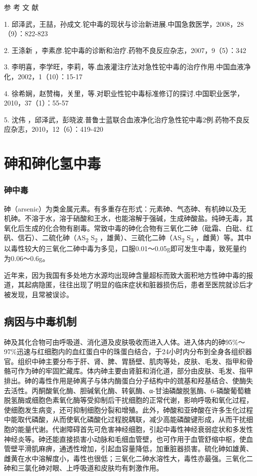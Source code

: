 \hypertarget{text00159.htmlux5cux23CHP5-6-3-4}{}
参 考 文 献

1.
邱泽武，王喆，孙成文.铊中毒的现状与诊治新进展.中国急救医学，2008，28（9）：822-823

2. 王涤新
，李素彦.铊中毒的诊断和治疗.药物不良反应杂志，2007，9（5）：342

3.
李明喜，李学旺，李莉，等.血液灌注疗法对急性铊中毒的治疗作用.中国血液净化，2002，1（10）：15-17

4.
徐希娴，赵赞梅，关里，等.对职业性铊中毒标准修订的探讨.中国职业医学，2010，37（1）：55-57

5. 沈伟
，邱泽武，彭晓波.普鲁士蓝联合血液净化治疗急性铊中毒2例.药物不良反应杂志，2010，12（6）：419-420

\protect\hypertarget{text00160.html}{}{}

\section{砷和砷化氢中毒}

\subsubsection{砷中毒}

砷（arsenic）为类金属元素。有多重存在形式：元素砷、气态砷、有机砷以及无机砷。不溶于水，溶于硝酸和王水，也能溶解于强碱，生成砷酸盐。纯砷无毒，其氧化后生成的化合物有剧毒。常致中毒的砷化合物有三氧化二砷（砒霜、白砒、红矾、信石）、二硫化砷（AS\textsubscript{2}
S\textsubscript{2} ，雄黄）、三硫化二砷（AS\textsubscript{2}
S\textsubscript{3}
，雌黄）等。其中以毒性较大的三氧化二砷中毒为多见，口服0.01～0.05g即可发生中毒，致死量约为0.06～0.6g。

近年来，因为我国有多处地方水源均出现砷含量超标而致大面积地方性砷中毒的报道，其起病隐匿，往往出现了明显的临床症状和脏器损伤后，患者至医院就诊后才被发现，且常被误诊。

\subsection{病因与中毒机制}

砷及其化合物可由呼吸道、消化道及皮肤吸收而进入人体。进入体内的砷95\%～97\%迅速与红细胞内的血红蛋白中的珠蛋白结合，于24小时内分布到全身各组织器官。组织中砷主要分布于肝、肾、脾、胃肠壁、肌肉等处，皮肤、毛发、指甲和骨骼可作为砷的牢固贮藏库。体内砷主要由肾脏和消化道，部分由皮肤、毛发、指甲排出。砷的毒性作用是砷离子与体内酶蛋白分子结构中的巯基和羟基结合、使酶失去活性。丙酮酸氧化酶、胆碱氧化酶、转氨酶、α-甘油磷酸脱氢酶、6-磷酸葡萄糖脱氢酶或细胞色素氧化酶等受抑制后干扰细胞的正常代谢，影响呼吸和氧化过程，使细胞发生病变，还可抑制细胞分裂和增殖。此外，砷酸和亚砷酸在许多生化过程中能取代磷酸，从而使氧化磷酸化过程脱耦联，减少高能磷酸键形成，从而干扰细胞的能量代谢。代谢障碍首先可危害神经细胞，引起中毒性神经衰弱症状和多发性神经炎等。砷还能直接损害小动脉和毛细血管壁，也可作用于血管舒缩中枢，使血管壁平滑肌麻痹，通透性增加，引起血容量降低，加重脏器损害。硫化砷如雄黄、雌黄在水中溶解度小，毒性也很低；三氧化二砷水溶性大，毒性亦最强。三氧化二砷和三氯化砷对眼、上呼吸道和皮肤均有刺激作用。

